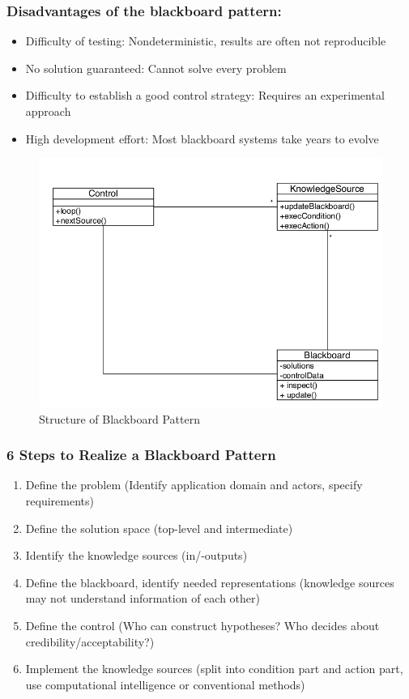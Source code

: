 \subsubsection*{Disadvantages of the blackboard pattern:}
\begin{itemize}
	\item Difficulty of testing:
		\subitem Nondeterministic, results are often not reproducible
	\item No solution guaranteed:
		\subitem Cannot solve every problem
	\item Difficulty to establish a good control strategy:
		\subitem Requires an experimental approach
	\item High development effort:
		\subitem Most blackboard systems take years to evolve
\end{itemize}
\newpage

\begin{figure}[h]
	\centering
	\includegraphics[width=0.85\linewidth]{images/pattern_blackboard.png}
	\caption{Structure of Blackboard Pattern}
\end{figure}

\subsubsection*{6 Steps to Realize a Blackboard Pattern}
\begin{enumerate}
	\item Define the problem (Identify application domain and actors, specify requirements)
	\item Define the solution space (top-level and intermediate)
	\item Identify the knowledge sources (in/-outputs)
	\item Define the blackboard, identify needed representations (knowledge sources may not understand information of each other)
	\item Define the control (Who can construct hypotheses? Who decides about credibility/acceptability?)
	\item Implement the knowledge sources (split into condition part and action part, use computational intelligence or conventional methods)
\end{enumerate}
\newpage

